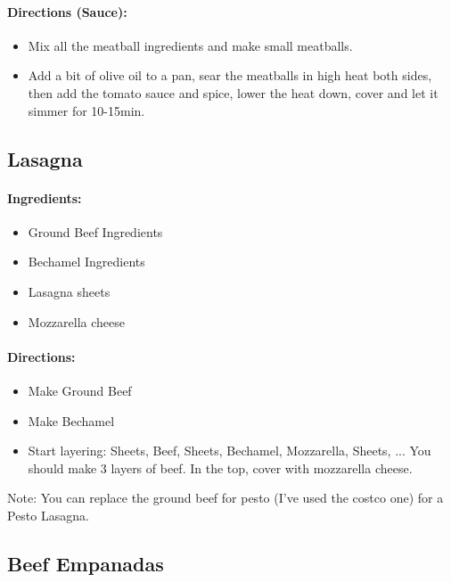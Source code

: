 \documentclass{article}
\begin{document}
\paragraph{Directions (Sauce):}
\begin{itemize}
	\item Mix all the meatball ingredients and make small meatballs.
	\item Add a bit of olive oil to a pan, sear the meatballs in high heat both sides, then add the tomato sauce and spice, lower the heat down, cover and let it simmer for 10-15min.
\end{itemize}

\subsection{Lasagna}

\paragraph{Ingredients:}

\begin{itemize}
  \item Ground Beef Ingredients
  \item Bechamel Ingredients
  \item Lasagna sheets
  \item Mozzarella cheese
\end{itemize}

\paragraph{Directions:}
\begin{itemize}
  \item Make Ground Beef
  \item Make Bechamel
  \item Start layering: Sheets, Beef, Sheets, Bechamel, Mozzarella, Sheets, ... You should make 3 layers of beef. In the top, cover with mozzarella cheese.
\end{itemize}

Note: You can replace the ground beef for pesto (I’ve used the costco one) for a Pesto Lasagna.

\subsection{Beef Empanadas}
\end{document}
